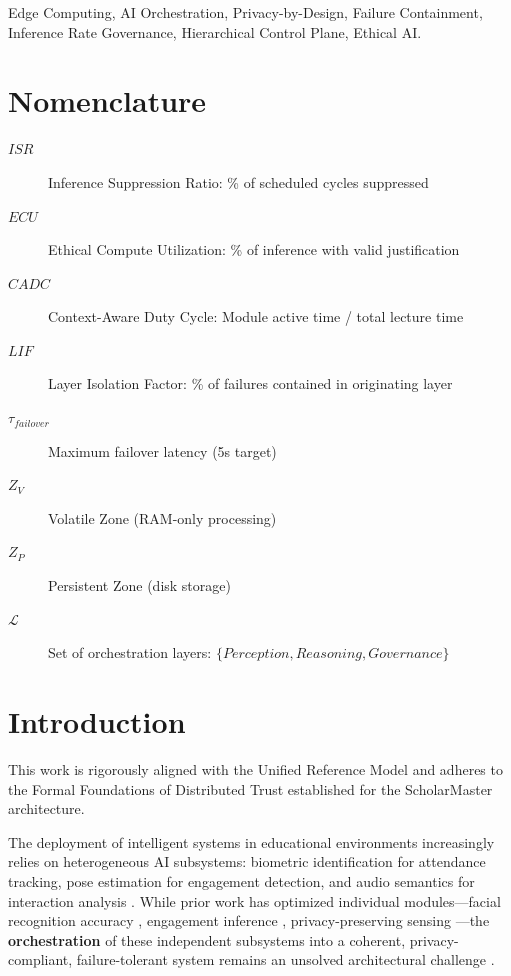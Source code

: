 \documentclass[conference]{IEEEtran}
\begin{document}
\begin{IEEEkeywords}
Edge Computing, AI Orchestration, Privacy-by-Design, Failure Containment, Inference Rate Governance, Hierarchical Control Plane, Ethical AI.
\end{IEEEkeywords}

\section*{Nomenclature}
\begin{description}
    \item[$ISR$] Inference Suppression Ratio: \% of scheduled cycles suppressed
    \item[$ECU$] Ethical Compute Utilization: \% of inference with valid justification
    \item[$CADC$] Context-Aware Duty Cycle: Module active time / total lecture time
    \item[$LIF$] Layer Isolation Factor: \% of failures contained in originating layer
    \item[$\tau_{failover}$] Maximum failover latency (5s target)
    \item[$Z_V$] Volatile Zone (RAM-only processing)
    \item[$Z_P$] Persistent Zone (disk storage)
    \item[$\mathcal{L}$] Set of orchestration layers: $\{Perception, Reasoning, Governance\}$
\end{description}

\section{Introduction} This work is rigorously aligned with the Unified Reference Model \cite{P20} and adheres to the Formal Foundations of Distributed Trust \cite{P21} established for the ScholarMaster architecture.

The deployment of intelligent systems in educational environments increasingly relies on heterogeneous AI subsystems: biometric identification for attendance tracking, pose estimation for engagement detection, and audio semantics for interaction analysis \cite{b19}. While prior work has optimized individual modules---facial recognition accuracy \cite{b1}, engagement inference \cite{b2}, privacy-preserving sensing \cite{b3}---the \textbf{orchestration} of these independent subsystems into a coherent, privacy-compliant, failure-tolerant system remains an unsolved architectural challenge \cite{b14}.
\end{document}
